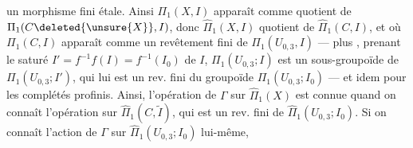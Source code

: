 un morphisme fini étale. Ainsi $\Pi_1(X,I)$ apparaît comme quotient de $\Pi_1(C\deleted{\unsure{X}},I)$, donc $\widehat\Pi_1(X,I)$ quotient de $\widehat\Pi_1(C,I)$, et où $\Pi_1(C,I)$ apparaît comme un revêtement fini de $\Pi_1(U_{0,3},I)$ --- plus  , prenant le saturé $I'=f^{-1}f(I)=f^{-1}(I_0)$ de $I$, $\Pi_1(U_{0,3};I)$ est un sous-groupoïde  de $\Pi_1(U_{0,3};I')$, qui lui est un rev. fini du groupoïde $\Pi_1(U_{0,3};I_0)$ --- et idem pour les complétés profinis. Ainsi, l'opération de $\Gamma$ sur $\widehat\Pi_1(X)$ est connue quand on connaît l'opération sur $\widehat\Pi_1(C,\widetilde I)$, qui est un rev. fini de $\widehat\Pi_1(U_{0,3};I_0)$. Si on connaît l'action de $\Gamma$ sur $\widehat\Pi_1(U_{0,3};I_0)$ lui-même,  

